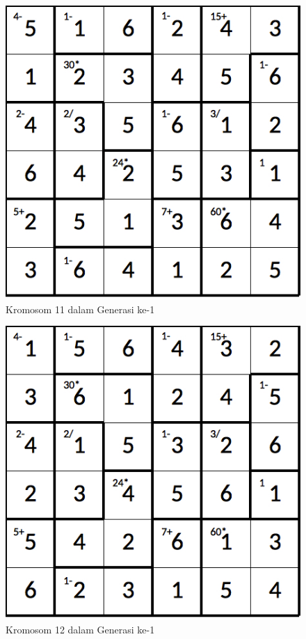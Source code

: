 \documentclass[a4paper,twoside]{article}
\begin{document}
\begin{enumerate}
\begin{figure}
\centering
\captionsetup{justification=centering}
\includegraphics[scale=0.333]{Gambar/hybridgenetic/Generation1Chromosome11}
\caption[Kromosom 11 dalam Generasi ke-1]{Kromosom 11 dalam Generasi ke-1}
\label{fig:analisisg1k11}
\end{figure}

\begin{figure}
\centering
\captionsetup{justification=centering}
\includegraphics[scale=0.333]{Gambar/hybridgenetic/Generation1Chromosome12}
\caption[Kromosom 12 dalam Generasi ke-1]{Kromosom 12 dalam Generasi ke-1}
\label{fig:analisisg1k12}
\end{figure}


\end{enumerate}
\end{document}
